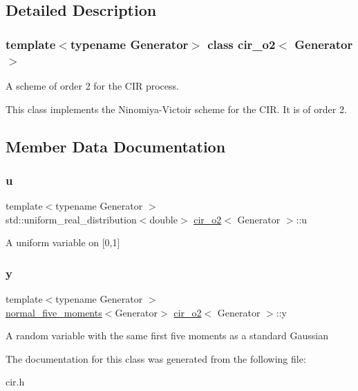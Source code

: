 \subsection{Detailed Description}
\subsubsection*{template$<$typename Generator$>$\newline
class cir\+\_\+o2$<$ Generator $>$}

A scheme of order 2 for the C\+IR process. 

This class implements the Ninomiya-\/\+Victoir scheme for the C\+IR. It is of order 2. 

\subsection{Member Data Documentation}
\mbox{\label{classcir__o2_a37d01ddf0963358ef44dcb20938b54fa}} 
\subsubsection{\texorpdfstring{u}{u}}
{\footnotesize\ttfamily template$<$typename Generator $>$ \\
std\+::uniform\+\_\+real\+\_\+distribution$<$double$>$ \mbox{\hyperlink{classcir__o2}{cir\+\_\+o2}}$<$ Generator $>$\+::u\hspace{0.3cm}{\ttfamily [protected]}}

A uniform variable on \mbox{[}0,1\mbox{]} \mbox{\label{classcir__o2_a13719fb45e809812b9f62916d6baba2c}} 
\subsubsection{\texorpdfstring{y}{y}}
{\footnotesize\ttfamily template$<$typename Generator $>$ \\
\mbox{\hyperlink{classnormal__five__moments}{normal\+\_\+five\+\_\+moments}}$<$Generator$>$ \mbox{\hyperlink{classcir__o2}{cir\+\_\+o2}}$<$ Generator $>$\+::y\hspace{0.3cm}{\ttfamily [protected]}}

A random variable with the same first five moments as a standard Gaussian 

The documentation for this class was generated from the following file\+:\begin{DoxyCompactItemize}
\item 
cir.\+h\end{DoxyCompactItemize}
